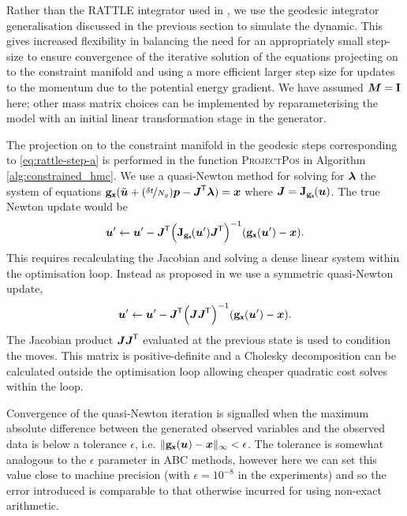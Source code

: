 Rather than the RATTLE integrator used in \citep{brubaker2012family}, we use the geodesic integrator generalisation discussed in the previous section to simulate the dynamic. This gives increased flexibility in balancing the need for an appropriately small step-size to ensure convergence of the iterative solution of the equations projecting on to the constraint manifold and using a more efficient larger step size for updates to the momentum due to the potential energy gradient. We have assumed $\boldsymbol{M} = \mathbf{I}$ here; other mass matrix choices can be implemented by reparameterising the model with an initial linear transformation stage in the generator.

The projection on to the constraint manifold in the geodesic steps corresponding to \eqref{eq:rattle-step-a} is performed in the function \textsc{ProjectPos} in Algorithm \ref{alg:constrained_hmc}. We use a quasi-Newton method for solving for $\boldsymbol{\lambda}$ the system of equations ${\mathbf{g}}_{\boldsymbol{\mathsf{x}}}(\tilde{\boldsymbol{u}} + (\nicefrac{\delta t}{N_g}) \boldsymbol{p} - \boldsymbol{J}^{\mkern-1.5mu\mathsf{T}}\boldsymbol{\lambda}) = \boldsymbol{x}$ where $\mtx{J} = \jacob{\genfunc_{\rvct{x}}}{\vct{u}}$. The true Newton update would be
\begin{equation}\label{eq:newton-iteration}
    \vct{u}'\gets \vct{u}' - 
    \mtx{J}\tr
    \lpa 
        \jacob{\genfunc_{\rvct{x}}}{\vct{u}'}\mtx{J}\tr
    \rpa^{-1}
    \lpa \genfunc_{\rvct{x}}(\vct{u}') - \vct{x} \rpa.
\end{equation}
This requires recalculating the Jacobian and solving a dense linear system within the optimisation loop. Instead as proposed in \citep{barth1995algorithms} we use a symmetric quasi-Newton update, 
\begin{equation}\label{eq:quasi-newton-iteration}
    \vct{u}'\gets \vct{u}' - 
    \mtx{J}\tr
    \lpa 
        \mtx{J}\mtx{J}\tr
    \rpa^{-1}
    \lpa \genfunc_{\rvct{x}}(\vct{u}') - \vct{x} \rpa.
\end{equation}
The Jacobian product $\boldsymbol{J}\boldsymbol{J}^{\mkern-1.5mu\mathsf{T}}$ evaluated at the previous state is used to condition the moves. This matrix is positive-definite and a Cholesky decomposition can be calculated outside the optimisation loop allowing cheaper quadratic cost solves within the loop. 

Convergence of the quasi-Newton iteration is signalled when the maximum absolute difference between the generated observed variables and the observed data is below a tolerance $\epsilon$, i.e. 
\(
  \Vert {\mathbf{g}}_{\boldsymbol{\mathsf{x}}}(\boldsymbol{u}) - \boldsymbol{x}\Vert_\infty < \epsilon 
\). The tolerance is somewhat analogous to the $\epsilon$ parameter in \ac{ABC} methods, however here we can set this value close to machine precision (with $\epsilon = 10^{-8}$ in the experiments) and so the error introduced is comparable to that otherwise incurred for using non-exact arithmetic.

